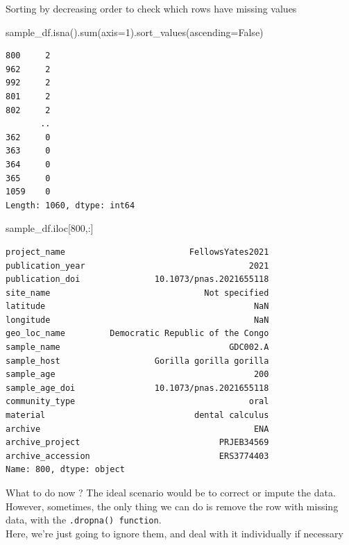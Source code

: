 \documentclass[
  letterpaper,
]{book}
\newenvironment{Shaded}{}{}
\newcommand{\BuiltInTok}[1]{\textcolor[rgb]{0.84,0.23,0.29}{#1}}
\newcommand{\DecValTok}[1]{\textcolor[rgb]{0.00,0.36,0.77}{#1}}
\newcommand{\NormalTok}[1]{\textcolor[rgb]{0.14,0.16,0.18}{#1}}
\newcommand{\OperatorTok}[1]{\textcolor[rgb]{0.14,0.16,0.18}{#1}}
\newcommand{\VariableTok}[1]{\textcolor[rgb]{0.89,0.38,0.04}{#1}}
\begin{document}
Sorting by decreasing order to check which rows have missing values

\begin{Shaded}
\begin{Highlighting}[]
\NormalTok{sample\_df.isna().}\BuiltInTok{sum}\NormalTok{(axis}\OperatorTok{=}\DecValTok{1}\NormalTok{).sort\_values(ascending}\OperatorTok{=}\VariableTok{False}\NormalTok{)}
\end{Highlighting}
\end{Shaded}

\begin{verbatim}
800     2
962     2
992     2
801     2
802     2
       ..
362     0
363     0
364     0
365     0
1059    0
Length: 1060, dtype: int64
\end{verbatim}

\begin{Shaded}
\begin{Highlighting}[]
\NormalTok{sample\_df.iloc[}\DecValTok{800}\NormalTok{,:]}
\end{Highlighting}
\end{Shaded}

\begin{verbatim}
project_name                         FellowsYates2021
publication_year                                 2021
publication_doi               10.1073/pnas.2021655118
site_name                               Not specified
latitude                                          NaN
longitude                                         NaN
geo_loc_name         Democratic Republic of the Congo
sample_name                                  GDC002.A
sample_host                   Gorilla gorilla gorilla
sample_age                                        200
sample_age_doi                10.1073/pnas.2021655118
community_type                                   oral
material                              dental calculus
archive                                           ENA
archive_project                            PRJEB34569
archive_accession                          ERS3774403
Name: 800, dtype: object
\end{verbatim}

What to do now ? The ideal scenario would be to correct or impute the
data.\\
However, sometimes, the only thing we can do is remove the row with
missing data, with the \texttt{.dropna()\ function}.\\
Here, we're just going to ignore them, and deal with it individually if
necessary
\end{document}
